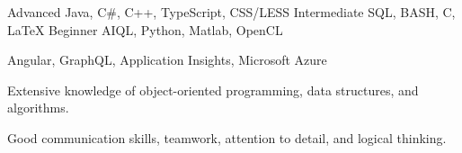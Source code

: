\vspace{-6mm}
\begin{multicols}{2}
\begin{minipage}[t]{0.45\textwidth}

\begin{cventries}
  \cventry
    {Advanced}
    {}
    {}
    {}
    {Java, C\#, C++, TypeScript, CSS/LESS
    }
  \cventry
    {Intermediate}
    {}
    {}
    {}
    {SQL, BASH, C, LaTeX
    }
  \cventry
    {Beginner}
    {}
    {}
    {}
    {AIQL, Python, Matlab, OpenCL
    }
\end{cventries}

\end{minipage}

\begin{minipage}[t]{0.45\textwidth}

\begin{cventries}
  \cventry
    {}
    {}
    {}
    {}
    {Angular, GraphQL, Application Insights, Microsoft Azure
    }
\end{cventries}

\begin{cventries}
  \cventry
    {}
    {}
    {}
    {}
    { \begin{cvitems}
        \item {Extensive knowledge of object-oriented programming, data \vfill structures, and algorithms.}
        \item {Good communication skills, teamwork, attention to detail, \vfill and logical thinking.}
      \end{cvitems}
    }
    \vspace{-20pt}
\end{cventries}

\end{minipage}

\end{multicols}
\vspace{-5pt}